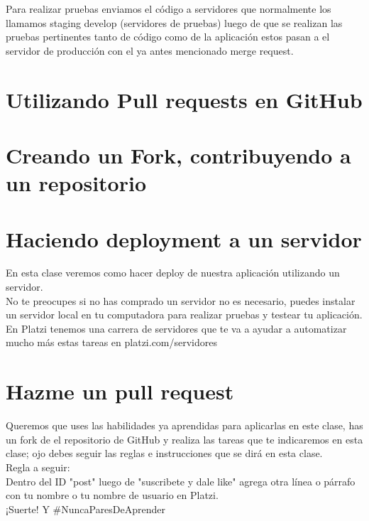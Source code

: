 \documentclass{article}
\begin{document}
Para realizar pruebas enviamos el código a servidores que normalmente los
llamamos staging develop (servidores de pruebas) luego de que se realizan las
pruebas pertinentes tanto de código como de la aplicación estos pasan a el
servidor de producción con el ya antes mencionado merge request.\\

\section{Utilizando Pull requests en GitHub}%

\section{Creando un Fork, contribuyendo a un repositorio}%

\section{Haciendo deployment a un servidor}%
En esta clase veremos como hacer deploy de nuestra aplicación utilizando un
servidor.\\

No te preocupes si no has comprado un servidor no es necesario, puedes instalar
un servidor local en tu computadora para realizar pruebas y testear tu
aplicación.\\

En Platzi tenemos una carrera de servidores que te va a ayudar a automatizar
mucho más estas tareas en platzi.com/servidores\\

\section{Hazme un pull request}%
Queremos que uses las habilidades ya aprendidas para aplicarlas en este clase,
has un fork de el repositorio de GitHub y realiza las tareas que te indicaremos
en esta clase; ojo debes seguir las reglas e instrucciones que se dirá en esta
clase.\\

Regla a seguir:\\

Dentro del ID "post" luego de "suscribete y dale like" agrega otra línea o
párrafo con tu nombre o tu nombre de usuario en Platzi.\\

¡Suerte! Y \#NuncaParesDeAprender
\end{document}
